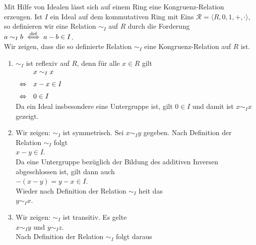 Mit Hilfe von Idealen l\"{a}sst sich auf einem Ring eine Kongruenz-Relation erzeugen.  Ist $I$ ein Ideal auf
dem kommutativen Ring mit Eins $\mathcal{R} = \langle R, 0, 1, +, \cdot \rangle$, so definieren wir eine Relation $\sim_I$ auf
$R$ durch die Forderung
\\[0.2cm]
\hspace*{1.3cm}
$a \sim_I b \;\stackrel{\mbox{\scriptsize def}}{\Longleftrightarrow}\; a - b \in I$.
\\[0.2cm]
Wir zeigen, dass die so definierte Relation $\sim_I$ eine Kongruenz-Relation auf $R$ ist.
\begin{enumerate}
\item $\sim_I$ ist reflexiv auf $R$, denn f\"{u}r alle $x \in R$ gilt
      \\[0.2cm]
      \hspace*{1.3cm}
      $
      \begin{array}[t]{cl}
                      & x \sim_I x   \\[0.2cm] 
      \Leftrightarrow & x - x \in I  \\[0.2cm] 
      \Leftrightarrow & 0 \in I  
      \end{array}
      $
      \\[0.2cm]
      Da ein Ideal insbesondere eine Untergruppe ist, gilt $0 \in I$ und damit ist $x \sim_I x$
      gezeigt. {\color{green}{\checkmark}}
\item Wir zeigen: $\sim_I$ ist symmetrisch.  Sei $x \sim_I y$ gegeben.  Nach Definition der
      Relation $\sim_I$ folgt  
      \\[0.2cm]
      \hspace*{1.3cm}
      $x - y \in I$.
      \\[0.2cm]
      Da eine Untergruppe bez\"{u}glich der Bildung des additiven Inversen abgeschlossen ist, gilt dann auch
      \\[0.2cm]
      \hspace*{1.3cm}
      $-(x - y) = y - x \in I$.
      \\[0.2cm]
      Wieder nach Definition der Relation $\sim_I$ hei\3t das 
      \\[0.2cm]
      \hspace*{1.3cm}
      $y \sim_I x$.  
      {\color{green}{\checkmark}}
\item Wir zeigen: $\sim_I$ ist transitiv.  Es gelte
      \\[0.2cm]
      \hspace*{1.3cm}
      $x \sim_I y$ \quad und \quad $y \sim_I z$.
      \\[0.2cm]
      Nach Definition der Relation $\sim_I$ folgt daraus

\end{enumerate}

